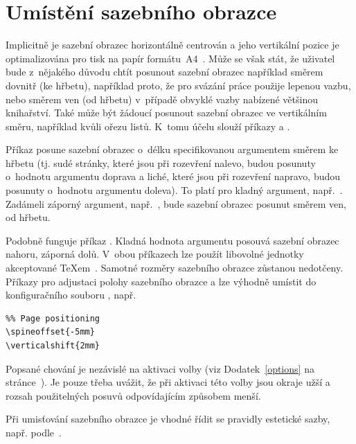 
\chapter{Umístění sazebního obrazce}\label{mirror}%

Implicitně je sazební obrazec horizontálně centrován a jeho vertikální pozice
je optimalizována pro tisk na papír
formátu~A4~\cite{SSMGT:LIVE::FormatyPapiru}. Může se však stát, že uživatel
bude z~nějakého důvodu chtít posunout sazební obrazec například směrem dovnitř
(ke hřbetu), například proto, že pro svázání práce použije lepenou vazbu, nebo
směrem ven (od hřbetu) v~případě obvyklé vazby nabízené většinou
knihařství. Také může být žádoucí posunout sazební obrazec ve vertikálním
směru, například kvůli ořezu listů.  K~tomu účelu slouží příkazy
 a .

Příkaz  posune sazební obrazec o~délku
specifikovanou argumentem směrem ke hřbetu (tj. sudé stránky, které jsou při
rozevření nalevo, budou posunuty o~hodnotu argumentu doprava a liché, které
jsou při rozevření napravo, budou posunuty o~hodnotu argumentu doleva). To
platí pro kladný argument, např.~\pgm{5mm}. Zadáme\discretionary{-}{-}{-}li
záporný argument, např.~\pgm{-24pt}, bude sazební obrazec posunut směrem ven,
od hřbetu.

Podobně funguje příkaz . Kladná hodnota
argumentu posouvá sazební obrazec nahoru, záporná dolů. V~obou příkazech lze
použít libovolné jednotky akceptované \TeX em~\cite{Ryb:2005:LaTeX:3,%
  Kop-Dal:2004:LaTeXPodrPruv:,%
  Goo-Mit-Sam:1994:Companion:}. Samotné rozměry sazebního obrazce zůstanou
nedotčeny. Příkazy pro adjustaci polohy sazebního obrazce  a  lze výhodně umístit do
konfiguračního souboru , např.

{\small
\begin{verbatim}
%% Page positioning
\spineoffset{-5mm}
\verticalshift{2mm}
\end{verbatim}
\par}

\noindent
Popsané chování je nezávislé na aktivaci volby  (viz
Dodatek~\ref{options} na stránce~\pageref{opnarrowmargin}). Je pouze třeba
uvážit, že při aktivaci této volby jsou okraje užší a rozsah použitelných
posuvů odpovídajícím způsobem menší.

Při umisťování sazebního obrazce je vhodné řídit se pravidly estetické
sazby, např. podle~\cite{Pop-Fle-Pop:1984:SazbaI:}.

\endinput

